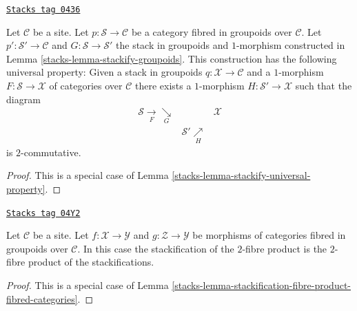 \begin{lemma}
\label{stacks-lemma-stackify-groupoids-universal-property}
\href{https://stacks.math.columbia.edu/tag/0436}{\texttt{Stacks tag 0436}}

Let $\mathcal{C}$ be a site.
Let $p : \mathcal{S} \to \mathcal{C}$ be a category fibred in groupoids
over $\mathcal{C}$. Let $p' : \mathcal{S}' \to \mathcal{C}$ and
$G : \mathcal{S} \to \mathcal{S}'$
the stack in groupoids and $1$-morphism constructed in
Lemma \ref{stacks-lemma-stackify-groupoids}.
This construction has the following universal property: Given a stack
in groupoids $q : \mathcal{X} \to \mathcal{C}$ and a $1$-morphism
$F : \mathcal{S} \to \mathcal{X}$ of categories over $\mathcal{C}$
there exists a $1$-morphism $H : \mathcal{S}' \to \mathcal{X}$
such that the diagram
$$
\begin{array}{ccc}\mathcal{S} \underset{F}{\longrightarrow}\underset{G}{\searrow} &  & \mathcal{X} \\  & \mathcal{S}' \underset{H}{\nearrow} & \end{array}
$$
is $2$-commutative.
\end{lemma}

\begin{proof}

This is a special case of
Lemma \ref{stacks-lemma-stackify-universal-property}.
\end{proof}

\begin{lemma}
\label{stacks-lemma-stackification-fibre-product-categories-fibred-in-groupoids}
\href{https://stacks.math.columbia.edu/tag/04Y2}{\texttt{Stacks tag 04Y2}}

Let $\mathcal{C}$ be a site.
Let $f : \mathcal{X} \to \mathcal{Y}$ and $g : \mathcal{Z} \to \mathcal{Y}$
be morphisms of categories fibred in groupoids over $\mathcal{C}$.
In this case the stackification of the $2$-fibre product is the $2$-fibre
product of the stackifications.
\end{lemma}

\begin{proof}

This is a special case of
Lemma \ref{stacks-lemma-stackification-fibre-product-fibred-categories}.
\end{proof}

